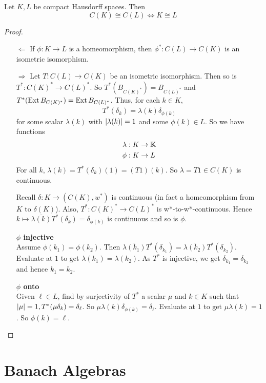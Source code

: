 \documentclass{article}
\begin{document}
\begin{thm}
  Let $K, L$ be compact Hausdorff spaces. Then
  $$C(K) \cong C(L) \iff K \cong L$$
\end{thm}
\begin{proof}~
  \begin{itemize}
    \item[$\Leftarrow$] If $\phi : K \to L$ is a homeomorphism, then $\phi^* : C(L) \to C(K)$ is an isometric isomorphism.
    \item[$\Rightarrow$] Let $T : C(L) \to C(K)$ be an isometric isomorphism. Then so is $T^* : C(K)^* \to C(L)^*$. So $T^*(B_{C(K)^*}) = B_{C(L)^*}$ and $T^*(\operatorname{Ext} B_{C(K)^*}) = \operatorname{Ext} B_{C(L)^*}$. Thus, for each $k \in K$,
    $$T^*(\delta_k) = \lambda(k) \delta_{\phi(k)}$$
    for some scalar $\lambda(k)$ with $\left\lvert \lambda(k)\right\rvert = 1$ and some $\phi(k) \in L$. So we have functions
    \begin{align*}
      \lambda : K & \to \mathbb K \\
      \phi : K & \to L
    \end{align*}
    For all $k$, $\lambda(k) = T^*(\delta_k)(1) = (T 1)(k)$. So $\lambda = T 1 \in C(K)$ is continuous.

    Recall $\delta : K \to (C(K), w^*)$ is continuous (in fact a homeomorphism from $K$ to $\delta(K)$). Also, $T^* : C(K)^* \to C(L)^*$ is w*-to-w*-continuous. Hence $k \mapsto \overline{\lambda(k)}T^*(\delta_k) = \delta_{\phi(k)}$ is continuous and so is $\phi$.

    {\bf $\phi$ injective} \\
    Assume $\phi(k_1) = \phi(k_2)$. Then $\overline{\lambda(k_1)}T^*(\delta_{k_1}) = \overline{\lambda(k_2)}T^*(\delta_{k_2})$. Evaluate at $1$ to get $\lambda(k_1) = \lambda(k_2)$. As $T^*$ is injective, we get $\delta_{k_1} = \delta_{k_2}$ and hence $k_1 = k_2$.

    {\bf $\phi$ onto} \\
    Given $\ell \in L$, find by surjectivity of $T^*$ a scalar $\mu$ and $k \in K$ such that $\left\lvert \mu\right\rvert = 1, T^*(\mu\delta_k) = \delta_\ell$. So $\mu \lambda(k)\delta_{\phi(k)} = \delta_\ell$. Evaluate at $1$ to get $\mu \lambda(k) = 1$. So $\phi(k) = \ell$.
  \end{itemize}
\end{proof}

\clearpage

\section{Banach Algebras}
\end{document}

